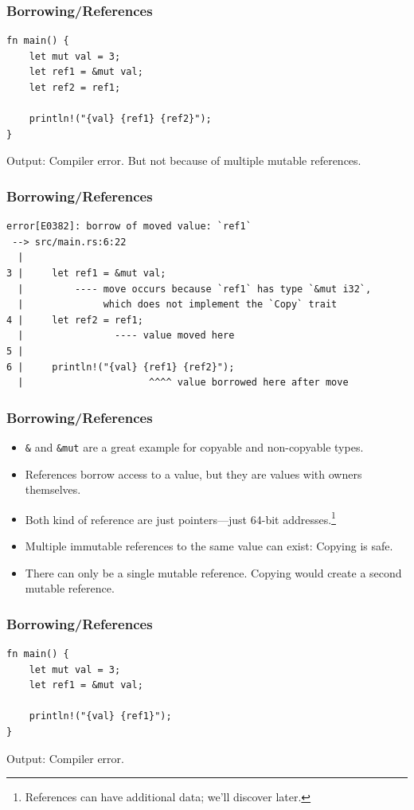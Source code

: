 \begin{frame}[fragile]
    \frametitle{Borrowing/References}
    \begin{verbatim}
fn main() {
    let mut val = 3;
    let ref1 = &mut val;
    let ref2 = ref1;

    println!("{val} {ref1} {ref2}");
}
    \end{verbatim}
    \vfill
    Output:
    \pause
    \vfill
    Compiler error. But not because of multiple mutable references.
\end{frame}

\begin{frame}[fragile]
    \frametitle{Borrowing/References}
    \begin{verbatim}
error[E0382]: borrow of moved value: `ref1`
 --> src/main.rs:6:22
  |
3 |     let ref1 = &mut val;
  |         ---- move occurs because `ref1` has type `&mut i32`,
  |              which does not implement the `Copy` trait
4 |     let ref2 = ref1;
  |                ---- value moved here
5 |
6 |     println!("{val} {ref1} {ref2}");
  |                      ^^^^ value borrowed here after move
    \end{verbatim}
\end{frame}

\begin{frame}[fragile]
    \frametitle{Borrowing/References}
    \begin{itemize}
        \item \texttt{\&} and \texttt{\&mut} are a great example for copyable and non-copyable types.
        \item References borrow access to a value, but they are values with owners themselves.
        \item Both kind of reference are just pointers---just 64-bit addresses.\footnote{References can have additional data; we'll discover later.}
        \pause
        \item Multiple immutable references to the same value can exist: Copying is safe.
        \pause
        \item There can only be a single mutable reference. Copying would create a second mutable reference.
    \end{itemize}
\end{frame}

\begin{frame}[fragile]
    \frametitle{Borrowing/References}
    \begin{verbatim}
fn main() {
    let mut val = 3;
    let ref1 = &mut val;

    println!("{val} {ref1}");
}
    \end{verbatim}
    \vfill
    Output:
    \pause
    \vfill
    Compiler error.
\end{frame}

